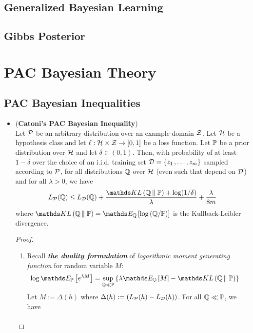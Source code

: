 \documentclass[11pt]{article}
\begin{document}
\subsection{Generalized Bayesian Learning}
\subsection{Gibbs Posterior}

\section{PAC Bayesian Theory}
\subsection{PAC Bayesian Inequalities}
\begin{itemize}
\item \begin{theorem} (\textbf{Catoni's PAC Bayesian Inequality})\citep{catoni2003pac, alquier2021user}\\
Let ${\mathcal P}$ be an arbitrary distribution over an example domain ${\mathcal Z}$. Let ${\mathcal H}$ be a hypothesis class and let $\ell: {\mathcal H} \times {\mathcal Z} \to [0,1]$ be a loss function. Let ${\mathbb P}$ be a prior distribution over ${\mathcal H}$ and let $\delta \in (0,1)$. Then, with probability of at least $1 - \delta$ over
the choice of an i.i.d. training set ${\mathcal D} = \left\{z_1 \,{,}\ldots{,}\, z_m\right\}$ sampled according to ${\mathcal P}$, for all distributions ${\mathbb Q}$ over ${\mathcal H}$ (even such that depend on ${\mathcal D}$) and for all $\lambda >0$, we have
\begin{align}
L_{\cP}(\bQ) \le L_{\cD}(\bQ) + \frac{\kl{\bQ}{\bP}  + \log(1/\delta) }{\lambda} +  \frac{\lambda }{8m}  \label{ineqn: catoni_pac_bayes_kl}
\end{align} where $\kl{\bQ}{\bP} = \E{\bQ}{\log \paren{\bQ / \bP}}$ is the Kullback-Leibler divergence.
\end{theorem}
\begin{proof}
\begin{enumerate}
\item Recall \textit{\textbf{the duality formulation}} of \emph{logarithmic moment generating function} for random variable $M$:
\begin{align*}
\log \E{\bP}{e^{\lambda M}} &= \sup_{\bQ \ll \bP}\set{ \lambda \E{\bQ}{M} - \kl{\bQ}{\bP} }
\end{align*} Let $M := \Delta(h)$ where $\Delta(h) := \left(L_{{\mathcal P}}(h) - L_{{\mathcal D}}(h)\right)$. For all ${\mathbb Q} \ll {\mathbb P}$, we have
\begin{align}

\end{align}
\end{enumerate}
\end{proof}
\end{itemize}
\end{document}
